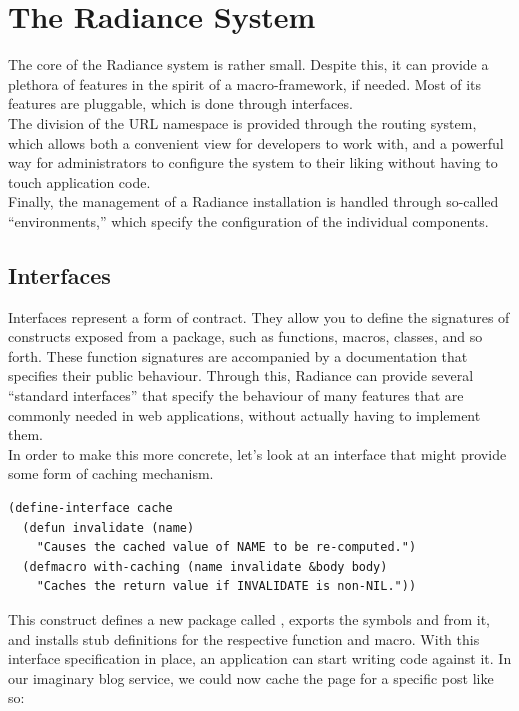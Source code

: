\documentclass{sig-alternate}
\begin{document}
\section{The Radiance System}
The core of the Radiance system is rather small. Despite this, it can provide a plethora of features in the spirit of a macro-framework, if needed. Most of its features are pluggable, which is done through interfaces. \\

The division of the URL namespace is provided through the routing system, which allows both a convenient view for developers to work with, and a powerful way for administrators to configure the system to their liking without having to touch application code. \\

Finally, the management of a Radiance installation is handled through so-called ``environments,'' which specify the configuration of the individual components.

\subsection{Interfaces}
Interfaces represent a form of contract. They allow you to define the signatures of constructs exposed from a package, such as functions, macros, classes, and so forth. These function signatures are accompanied by a documentation that specifies their public behaviour. Through this, Radiance can provide several ``standard interfaces'' that specify the behaviour of many features that are commonly needed in web applications, without actually having to implement them. \\

In order to make this more concrete, let's look at an interface that might provide some form of caching mechanism.

\begin{verbatim}
(define-interface cache
  (defun invalidate (name)
    "Causes the cached value of NAME to be re-computed.")
  (defmacro with-caching (name invalidate &body body)
    "Caches the return value if INVALIDATE is non-NIL."))
\end{verbatim}

This construct defines a new package called , exports the symbols  and  from it, and installs stub definitions for the respective function and macro. With this interface specification in place, an application can start writing code against it. In our imaginary blog service, we could now cache the page for a specific post like so:
\end{document}
